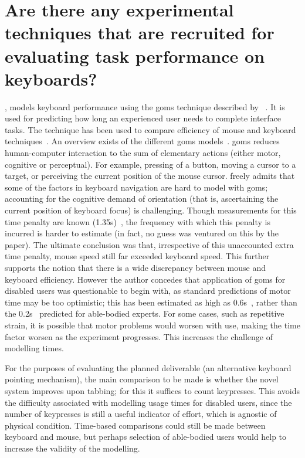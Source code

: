 \documentclass[a4paper, 12pt]{report}
\begin{document}
\section{Are there any experimental techniques that are recruited for evaluating task performance on keyboards?}
\citeauthor{schrepp2006efficiency}, \citeyear{schrepp2006efficiency} models keyboard performance using the \gls{goms} technique described by \citeauthor{card1983psychology}~\cite{card1983psychology}. It is used for predicting how long an experienced user needs to complete interface tasks. The technique has been used to compare efficiency of mouse and keyboard techniques~\cite{card1983psychology,john1996goms}. An overview exists of the different \gls{goms} models~\cite{john1995goms}. \gls{goms} reduces human-computer interaction to the sum of elementary actions (either motor, cognitive or perceptual). For example, pressing of a button, moving a cursor to a target, or perceiving the current position of the mouse cursor. \citeauthor{schrepp2006efficiency} freely admits that some of the factors in keyboard navigation are hard to model with \gls{goms}; accounting for the cognitive demand of orientation (that is, ascertaining the current position of keyboard focus) is challenging. Though measurements for this time penalty are known (1.35s)~\cite{raskin2000humane}, the frequency with which this penalty is incurred is harder to estimate (in fact, no guess was ventured on this by the paper). The ultimate conclusion was that, irrespective of this unaccounted extra time penalty, mouse speed still far exceeded keyboard speed. This further supports the notion that there is a wide discrepancy between mouse and keyboard efficiency. However the author concedes that application of \gls{goms} for disabled users was questionable to begin with, as standard predictions of motor time may be too optimistic; this has been estimated as high as 0.6s~\cite{keates1998developing}, rather than the 0.2s~\cite{raskin2000humane} predicted for able-bodied experts. For some cases, such as repetitive strain, it is possible that motor problems would worsen with use, making the time factor worsen as the experiment progresses. This increases the challenge of modelling times.

For the purposes of evaluating the planned deliverable (an alternative keyboard pointing mechanism), the main comparison to be made is whether the novel system improves upon tabbing; for this it suffices to count keypresses. This avoids the difficulty associated with modelling usage times for disabled users, since the number of keypresses is still a useful indicator of effort, which is agnostic of physical condition. Time-based comparisons could still be made between keyboard and mouse, but perhaps selection of able-bodied users would help to increase the validity of the modelling.
\end{document}
